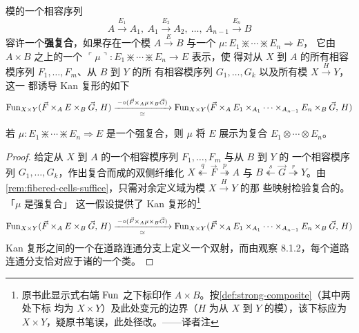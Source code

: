 \begin{definition}\label{def:strong-composite}
模的一个相容序列
\begin{equation*}
A\xrightarrow{E_{1}}A_{1},\ A_{1}\xrightarrow{E_{2}}A_{2},\ \ldots,\
A_{n-1}\xrightarrow{E_{n}}B
\end{equation*}
容许一个\textbf{强复合}，如果存在一个模 $A\xrightarrow{E}B$ 与一个%
\trFibered\trCell{} $\mu\colon E_{1}\divideontimes\cdots\divideontimes E_{n}\Rightarrow E$，
它由 $A\times B$ 之上的一个\trFunctor{}
$\ulcorner\mu\urcorner\colon E_{1}\divideontimes\cdots\divideontimes E_{n}\to E$ 表示，使
得对从 $X$ 到 $A$ 的所有相容模序列 $F_{1},\ldots,F_{m}$、从 $B$ 到 $Y$ 的所
有相容模序列 $G_{1},\ldots,G_{k}$ 以及所有模 $X\xrightarrow{H}Y$，这一%
\trFunctor{}都诱导 Kan 复形的如下\trEquivalence
\begin{equation*}
\Fun_{X\times Y}(\vec{F}\times_{A}E\times_{B}\vec{G},\,H)
\xrightarrow[\ \simeq\ ]{\,-\circ(\vec{F}\times_{A}\mu\times_{B}\vec{G})\,}
\Fun_{X\times Y}(\vec{F}\times_{A}E_{1}\times_{A_{1}}\cdots\times_{A_{n-1}}E_{n}\times_{B}\vec{G},\,H)
\end{equation*}
\end{definition}

\begin{lemma}[强复合皆为复合]\label{lem:strong-composites-are-composites}
若 $\mu\colon E_{1}\divideontimes\cdots\divideontimes E_{n}\Rightarrow E$ 是一个强复合，则
$\mu$ 将 $E$ 展示为复合 $E_{1}\otimes\cdots\otimes E_{n}$。
\end{lemma}

\begin{proof}
给定从 $X$ 到 $A$ 的一个相容模序列 $F_{1},\ldots,F_{m}$ 与从 $B$ 到 $Y$ 的
一个相容模序列 $G_{1},\ldots,G_{k}$，作出复合而成的双侧纤维化
$X\overset{q}{\twoheadleftarrow}\vec{F}\overset{p}{\twoheadrightarrow}A$ 与
$B\overset{s}{\twoheadleftarrow}\vec{G}\overset{r}{\twoheadrightarrow}Y$。由%
\cref{rem:fibered-cells-suffice}，只需对余定义域为模 $X\xrightarrow{H}Y$ 的那
些\trFibered{}映射检验复合\trCell{}的\trUniversalProperty。「$\mu$ 是强复合」
这一假设提供了 Kan 复形的\trEquivalence\footnote{原书此显示式右端
$\operatorname{Fun}$ 之下标印作 $A\times B$。按\cref{def:strong-composite}（其中两处下标
均为 $X\times Y$）及此处变元的边界（$H$ 为从 $X$ 到 $Y$ 的模），该下标应为
$X\times Y$，疑原书笔误，此处径改。——译者注}
\begin{equation*}
\Fun_{X\times Y}(\vec{F}\times_{A}E\times_{B}\vec{G},\,H)
\xrightarrow[\ \simeq\ ]{\,-\circ(\vec{F}\times_{A}\mu\times_{B}\vec{G})\,}
\Fun_{X\times Y}(\vec{F}\times_{A}E_{1}\times_{A_{1}}\cdots\times_{A_{n-1}}E_{n}\times_{B}\vec{G},\,H)
\end{equation*}
Kan 复形之间的一个\trEquivalence{}在道路连通分支上定义一个双射，而由观察
8.1.2，每个道路连通分支恰对应于诸\trFunctor{}的一个\trIsomorphism{}类。
\end{proof}

